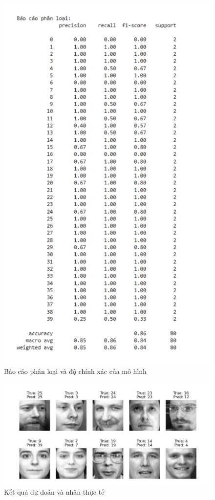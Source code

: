 \documentclass[a4paper,12pt]{extarticle}
\begin{document}
\begin{figure}[H]
    \centering
    \includegraphics[scale=1]{img/baocaophanloai.png}
    \caption{Báo cáo phân loại và độ chính xác của mô hình}
    \label{fig:enter-label}
\end{figure}
\begin{figure}[H]
    \centering
    \includegraphics[scale=0.8]{img/ketquadudoanvanhanthucte.png}
    \caption{Kết quả dự đoán và nhãn thực tế}
    \label{fig:enter-label}
\end{figure}
\end{document}
